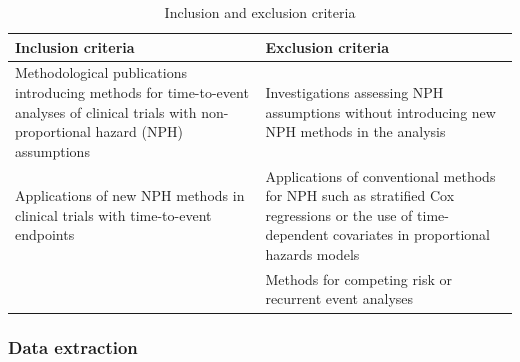 \begin{table}[h]
    \centering
    \caption{Inclusion and exclusion criteria}
    \begin{tabular}{p{5.5cm}|p{5.5cm}}
         Inclusion criteria	& Exclusion criteria  \\
         \hline
         Methodological publications introducing methods for time-to-event analyses of clinical trials with non-proportional hazard (NPH) assumptions & 	Investigations assessing NPH assumptions without introducing new NPH methods in the analysis\\
         Applications of new NPH methods in clinical trials with time-to-event endpoints &Applications of conventional methods for NPH such as stratified Cox regressions or the use of time-dependent covariates in proportional hazards models \cite{Klein.2003}\\
         &	Methods for competing risk or recurrent event analyses\\
    \end{tabular}
    \label{tab:Table1}
\end{table}

\subsubsection{Data extraction}

\noindent


